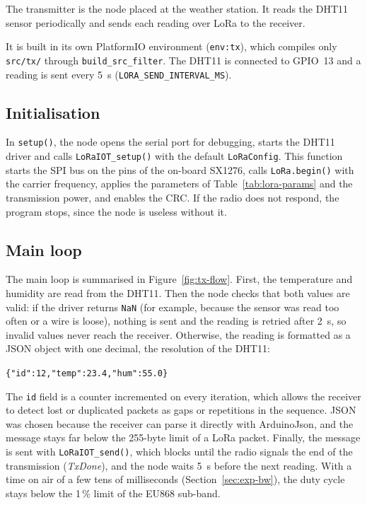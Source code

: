 \documentclass[informe,english]{plantilla}
\begin{document}
The transmitter is the node placed at the weather station. It reads the DHT11 sensor periodically and sends each reading over LoRa to the receiver. 

It is built in its own PlatformIO environment (\texttt{env:tx}), which compiles only \texttt{src/tx/} through \texttt{build\_src\_filter}. The DHT11 is connected to GPIO~13 and a reading is sent every 5~s (\texttt{LORA\_SEND\_INTERVAL\_MS}).

\subsection{Initialisation}

In \texttt{setup()}, the node opens the serial port for debugging, starts the DHT11 driver and calls \texttt{LoRaIOT\_setup()} with the default \texttt{LoRaConfig}. This function starts the SPI bus on the pins of the on-board SX1276, calls \texttt{LoRa.begin()} with the carrier frequency, applies the parameters of Table~\ref{tab:lora-params} and the transmission power, and enables the CRC. If the radio does not respond, the program stops, since the node is useless without it.

\subsection{Main loop}

The main loop is summarised in Figure~\ref{fig:tx-flow}. First, the temperature and humidity are read from the DHT11. Then the node checks that both values are valid: if the driver returns \texttt{NaN} (for example, because the sensor was read too often or a wire is loose), nothing is sent and the reading is retried after 2~s, so invalid values never reach the receiver. Otherwise, the reading is formatted as a JSON object with one decimal, the resolution of the DHT11:
\begin{center}
    \texttt{\{"id":12,"temp":23.4,"hum":55.0\}}
\end{center}
The \texttt{id} field is a counter incremented on every iteration, which allows the receiver to detect lost or duplicated packets as gaps or repetitions in the sequence. JSON was chosen because the receiver can parse it directly with ArduinoJson, and the message stays far below the 255-byte limit of a LoRa packet. Finally, the message is sent with \texttt{LoRaIOT\_send()}, which blocks until the radio signals the end of the transmission (\emph{TxDone}), and the node waits 5~s before the next reading. With a time on air of a few tens of milliseconds (Section~\ref{sec:exp-bw}), the duty cycle stays below the 1\,\% limit of the EU868 sub-band.
\end{document}
